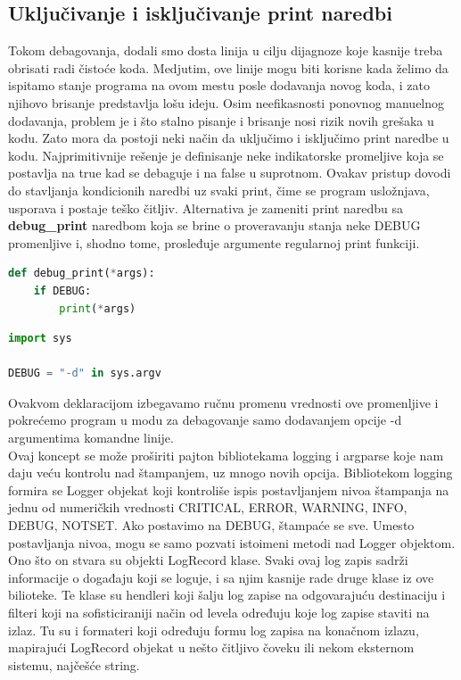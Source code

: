 \documentclass[a4paper]{article}
\begin{document}
\subsection{Uključivanje i isključivanje print naredbi}
Tokom debagovanja, dodali smo dosta linija u cilju dijagnoze koje kasnije treba obrisati radi čistoće koda. Medjutim, ove linije mogu biti korisne kada želimo da ispitamo stanje programa na ovom mestu posle dodavanja novog koda, i zato njihovo brisanje predstavlja lošu ideju. Osim neefikasnosti ponovnog manuelnog dodavanja, problem je i što stalno pisanje i brisanje nosi rizik novih grešaka u kodu. Zato mora da postoji neki način da uključimo i isključimo print naredbe u kodu. Najprimitivnije rešenje je definisanje neke indikatorske promeljive koja se postavlja na true kad se debaguje i na false u suprotnom. Ovakav pristup dovodi do stavljanja kondicionih naredbi uz svaki print, čime se program usložnjava, usporava i postaje teško čitljiv. 
Alternativa je zameniti print naredbu sa  \textbf{debug\_print} naredbom koja se brine o proveravanju stanja neke DEBUG promenljive i, shodno tome, prosleđuje argumente regularnoj print funkciji. 
\begin{lstlisting}[language = python, caption = {Definisanje nove print funkcije}]
def debug_print(*args):
    if DEBUG:
        print(*args)
\end{lstlisting}
\begin{lstlisting}[language = python, caption = {Deklarisanje DEBUG promenljive}]
import sys

DEBUG = "-d" in sys.argv
\end{lstlisting}
Ovakvom deklaracijom izbegavamo ručnu promenu vrednosti ove promenljive i pokrećemo program u modu za debagovanje samo dodavanjem opcije -d argumentima komandne linije. \\
\quad Ovaj koncept se može proširiti pajton bibliotekama logging \cite{logDocPyt} i argparse koje nam daju veću kontrolu nad štampanjem, uz mnogo novih opcija. Bibliotekom logging formira se Logger objekat koji kontroliše ispis postavljanjem nivoa štampanja na jednu od numeričkih vrednosti CRITICAL, ERROR, WARNING,  INFO, DEBUG, NOTSET. Ako postavimo na DEBUG, štampaće se sve. Umesto postavljanja nivoa, mogu se samo pozvati istoimeni metodi nad Logger objektom.
Ono što on stvara su objekti LogRecord klase. Svaki ovaj log zapis sadrži informacije o događaju koji se loguje, i sa njim kasnije rade druge klase iz ove bilioteke. Te klase su hendleri koji šalju log zapise na odgovarajuću destinaciju i filteri koji na sofisticiraniji način od levela određuju koje log zapise staviti na izlaz. Tu su i formateri koji određuju formu log zapisa na konačnom izlazu, mapirajući LogRecord objekat u nešto čitljivo čoveku ili nekom eksternom sistemu, najčešće string. 
\end{document}
